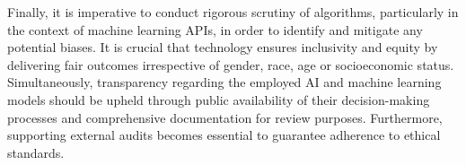 \documentclass[12pt,two side]{report}
\begin{document}
Finally, it is imperative to conduct rigorous scrutiny of algorithms, particularly in the context of machine learning APIs, in order to identify and mitigate any potential biases. It is crucial that technology ensures inclusivity and equity by delivering fair outcomes irrespective of gender, race, age or socioeconomic status\cite{ai2019high}. Simultaneously, transparency regarding the employed AI and machine learning models should be upheld through public availability of their decision-making processes and comprehensive documentation for review purposes. Furthermore, supporting external audits becomes essential to guarantee adherence to ethical standards\cite{icoAI}.

\end{document}
